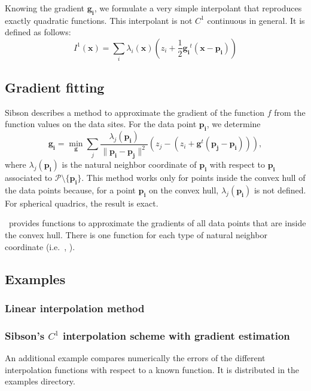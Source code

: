 Knowing the gradient $\mathbf{g_i}$, we formulate a very simple
interpolant that reproduces exactly quadratic functions. This
interpolant is not $C^1$ continuous in general.  It is defined as
follows:
\begin{displaymath}
  I^1(\mathbf{x}) = \sum_i \lambda_i(\mathbf{x}) 
  (z_i + \frac{1}{2} \mathbf{g_i}^t (\mathbf{x} - \mathbf{p_i}))  
\end{displaymath} 



\subsection{Gradient fitting} \label{s:gradient_fitting}
Sibson describes a method to approximate the gradient of the function
$f$ from the function values on the data sites. For the data point
$\mathbf{p_i}$, we determine
$$\mathbf{g_i} = \min_\mathbf{g} \sum_j
\frac{\lambda_j(\mathbf{p_i})}{\|\mathbf{p_i} - \mathbf{p_j}\|^2}
\left( z_j - (z_i + \mathbf{g}^t (\mathbf{p_j} -\mathbf{p_i})) \right),
$$
where $\lambda_j(\mathbf{p_i})$ is the natural neighbor coordinate
of $\mathbf{p_i}$ with respect to $\mathbf{p_i}$ associated to
$\mathcal{P} \setminus \{\mathbf{p_i}\}$. This method works only for
points inside the convex hull of the data points because, for a point
$\mathbf{p_i}$ on the convex hull, $\lambda_j(\mathbf{p_i})$ is not
defined. For spherical quadrics, the result is exact.

\cgal\ provides functions to approximate the gradients of all data
points that are inside the convex hull. There is one function for each
type of natural neighbor coordinate (i.e.\ , ).


\subsection{Examples}\label{subsec:interpol_examples}
\subsubsection{Linear interpolation method}

\subsubsection{Sibson's $C^1$ interpolation scheme with gradient estimation}

An additional example compares numerically the errors of the different 
interpolation functions with respect to a known function. 
It is distributed in the examples directory.

